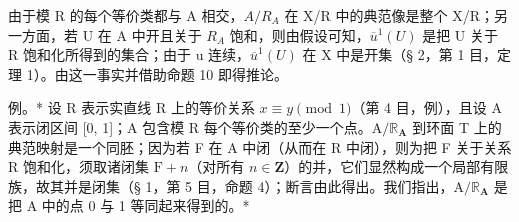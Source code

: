 由于模 R 的每个等价类都与 A 相交，\(A/R_{A}\) 在 X/R 中的典范像是整个 X/R；另一方面，若 U 在 A 中开且关于 \(R_{A}\) 饱和，则由假设可知，\(\overline{u}^{1}(U)\) 是把 U 关于 R 饱和化所得到的集合；由于 u 连续，\(\overline{u}^{1}(U)\) 在 X 中是开集（§ 2，第 1 目，定理 1）。由这一事实并借助命题 10 即得推论。

例。* 设 R 表示实直线 R 上的等价关系 \(x \equiv y \pmod{1}\)（第 4 目，例），且设 A 表示闭区间 {[}0, 1{]}；A 包含模 R 每个等价类的至少一个点。\(\mathrm{A} / \mathbb{R}_{\mathbf{A}}\) 到环面 T 上的典范映射是一个同胚；因为若 F 在 A 中闭（从而在 R 中闭），则为把 F 关于关系 R 饱和化，须取诸闭集 \(\mathrm{F} + n\)（对所有 \(n \in \mathbf{Z}\)）的并，它们显然构成一个局部有限族，故其并是闭集（§ 1，第 5 目，命题 4）；断言由此得出。我们指出，\(\mathrm{A} / \mathbb{R}_{\mathbf{A}}\) 是把 A 中的点 0 与 1 等同起来得到的。*


